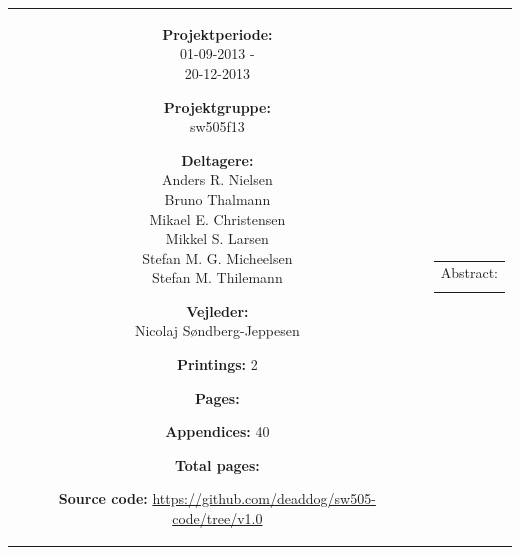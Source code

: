 \begin{titlepage}
\begin{nopagebreak}
{\begin{tabular}{cc}
{	\parbox{8cm}{
	\begin{description}
		\item { \textbf{Projektperiode:}}\\
			01-09-2013 -\\
			20-12-2013
 		\hspace{4cm}
		\item { \textbf{Projektgruppe:}}\\
  			sw505f13
 		\hspace{4cm}
		\item {\textbf{Deltagere:}}\\
			Anders R. Nielsen\\
			Bruno Thalmann\\
			Mikael E. Christensen\\
			Mikkel S. Larsen\\
			Stefan M. G. Micheelsen\\
			Stefan M. Thilemann\\
		\hspace{2cm}
		\item { \textbf{Vejleder:}}\\
 			Nicolaj Søndberg-Jeppesen\\
  	\end{description}
	}
	\begin{description}
		\item { \textbf{Printings:} 2}
		\item { \textbf{Pages:} \pageref{LastPageBody} } 
		\item { \textbf{Appendices:} 40}
		\item { \textbf{Total pages:} \pageref{LastPage} }
		\item { \textbf{Source code:} \url{https://github.com/deaddog/sw505-code/tree/v1.0}}
	\end{description}
	\vfill } &
	\parbox{6.5cm}{
 	 \vspace{.15cm}
  	\hfill 
  	\begin{tabular}{l}
  		{Abstract:}\bigskip \\
  		\fbox{
  		\parbox{6cm}{\bigskip
     		{\vfill{\small 
     		\bigskip}}
     	}}
   	\end{tabular}}
\end{tabular}
}%
\end{nopagebreak}
\end{titlepage}